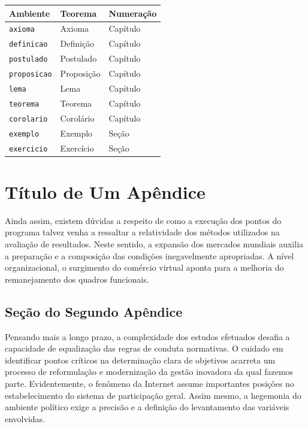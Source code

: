 \documentclass[fleqn]{profmat-cefet}
\begin{document}
\begin{spacing}{1}
\begin{longtable}{p{30mm}p{30mm}p{30mm}}   \hline
  Ambiente               & Teorema    & Numeração \\ \hline
  \endhead
  \lstinline!axioma!     & Axioma     & Capítulo  \\
  \lstinline!definicao!  & Definição  & Capítulo  \\
  \lstinline!postulado!  & Postulado  & Capítulo  \\
  \lstinline!proposicao! & Proposição & Capítulo  \\
  \lstinline!lema!       & Lema       & Capítulo  \\
  \lstinline!teorema!    & Teorema    & Capítulo  \\
  \lstinline!corolario!  & Corolário  & Capítulo  \\
  \lstinline!exemplo!    & Exemplo    & Seção     \\
  \lstinline!exercicio!  & Exercício  & Seção     \\ \hline
\end{longtable}

\end{spacing}

\chapter{Título de Um Apêndice}
\label{cap:mais_um_apendice}

Ainda assim, existem dúvidas a respeito de como a execução dos pontos do
programa talvez venha a ressaltar a relatividade dos métodos utilizados na
avaliação de resultados. Neste sentido, a expansão dos mercados mundiais auxilia
a preparação e a composição das condições inegavelmente apropriadas. A nível
organizacional, o surgimento do comércio virtual aponta para a melhoria do
remanejamento dos quadros funcionais. 

\section{Seção do Segundo Apêndice}
\label{sec:secao_do_segundo_apendice}

Pensando mais a longo prazo, a complexidade dos estudos efetuados desafia a
capacidade de equalização das regras de conduta normativas. O cuidado em
identificar pontos críticos na determinação clara de objetivos acarreta um
processo de reformulação e modernização da gestão inovadora da qual fazemos
parte. Evidentemente, o fenômeno da Internet assume importantes posições no
estabelecimento do sistema de participação geral. Assim mesmo, a hegemonia do
ambiente político exige a precisão e a definição do levantamento das variáveis
envolvidas. 
\end{document}
